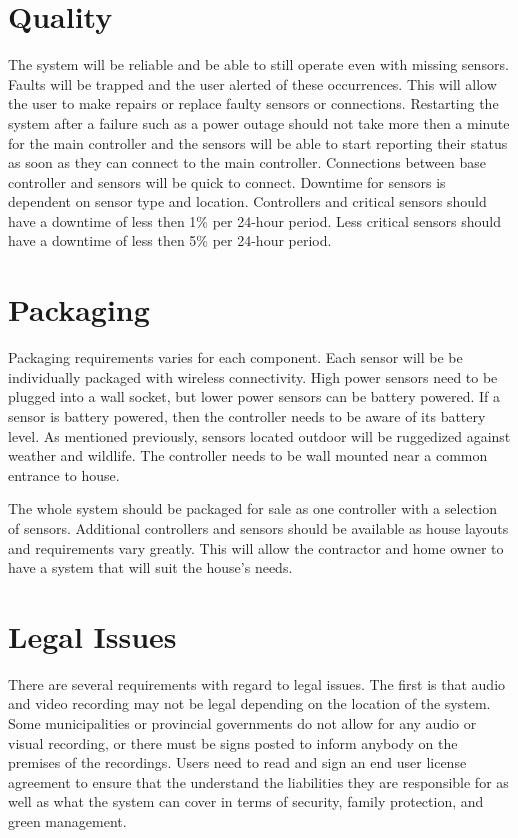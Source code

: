 \documentclass{report}
\begin{document}
\section{Quality}
The system will be reliable and be able to still operate even with missing
sensors. Faults will be trapped and the user alerted of these occurrences.
This will allow the user to make repairs or replace faulty sensors or
connections. Restarting the system after a failure such as a power outage
should not take more then a minute for the main controller and the sensors
will be able to start reporting their status as soon as they can connect to
the main controller. Connections between base controller and sensors will be
quick to connect. Downtime for sensors is dependent on sensor type and
location. Controllers and critical sensors should have a downtime of less then
1\% per 24-hour period. Less critical sensors should have a downtime of less
then 5\% per 24-hour period. 

\section{Packaging}
Packaging requirements varies for each component. Each sensor will be
be individually packaged with wireless connectivity. High power sensors need to
be plugged into a wall socket, but lower power sensors can be battery powered.
If a sensor is battery powered, then the controller needs to be aware of its
battery level. As mentioned previously, sensors located outdoor will be
ruggedized against weather and wildlife. The controller needs to be wall
mounted near a common entrance to house.

The whole system should be packaged for sale as one controller with a selection
of sensors. Additional controllers and sensors should be available as house
layouts and requirements vary greatly. This will allow the contractor and home
owner to have a system that will suit the house's needs.

\section{Legal Issues}
There are several requirements with regard to legal issues. The first is that
audio and video recording may not be legal depending on the location of the
system. Some municipalities or provincial governments do not allow for any
audio or visual recording, or there must be signs posted to inform anybody on
the premises of the recordings. Users need to read and sign an end user
license agreement to ensure that the understand the liabilities they are
responsible for as well as what the system can cover in terms of security,
family protection, and green management.
\end{document}
